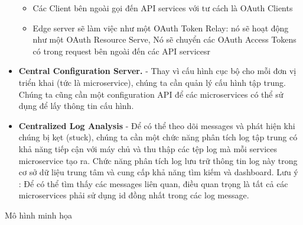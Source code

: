 \begin{itemize}
\begin{itemize}
	            \item Các Client bên ngoài gọi đến API services với tư cách là OAuth Clients
	            \item Edge server sẽ làm việc như một OAuth Token Relay: nó sẽ hoạt động như một OAuth Resource Serve, Nó sẽ chuyển các OAuth Access Tokens có trong request bên ngoài đến các API servicesr
	        \end{itemize}
	        \item \textbf{Central Configuration Server.} - Thay vì cấu hình cục bộ cho mỗi đơn vị triển khai (tức là microservice), chúng ta cần quản lý cấu hình tập trung. Chúng ta cũng cần một configuration API để các microservices có thể sử dụng để lấy thông tin cấu hình.
	        \item \textbf{Centralized Log Analysis} - Để có thể theo dõi messages và phát hiện khi chúng bị kẹt (stuck), chúng ta cần một chức năng phân tích log tập trung có khả năng tiếp cận với máy chủ và thu thập các tệp log mà mỗi services microservice tạo ra. Chức năng phân tích log lưu trữ thông tin log này trong cơ sở dữ liệu trung tâm và cung cấp khả năng tìm kiếm và dashboard. Lưu ý : Để có thể tìm thấy các messages liên quan, điều quan trọng là tất cả các microservices phải sử dụng id đồng nhất trong các log message.
		\end{itemize}
		Mô hình minh họa\\
		
		\newpage
		
